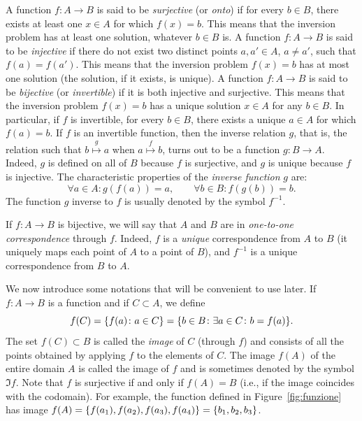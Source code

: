 A function $f\colon A \to B$ is said to be \emph{surjective}
  (or \emph{onto}) if for every $b\in B$,
there exists at least one $x\in A$ for which $f(x)=b$. This means that the
inversion problem has at least one solution, whatever $b\in B$ is. A function
$f\colon A \to B$ is said to be \emph{injective} 
 if there do not exist two distinct points $a,a' \in A$, $a\neq
a'$, such that $f(a) = f(a')$. This means that the inversion problem $f(x)=b$
has at most one solution (the solution, if it exists, is unique). A function
$f\colon A \to B$ is said to be \emph{bijective} 
 (or \emph{invertible}) 
  
 if it is both injective and surjective. This means that the
inversion problem $f(x)=b$ has a unique solution $x\in A$ for any $b\in B$. In
particular, if $f$ is invertible, for every $b\in B$, there exists a unique
$a\in A$ for which $f(a)=b$. If $f$ is an invertible function, then the inverse
relation $g$, that is, the relation such that $b\stackrel g \mapsto a$ when $a
\stackrel f \mapsto b$, turns out to be a function $g\colon B\to A$. Indeed, $g$
is defined on all of $B$ because $f$ is surjective, and $g$ is unique because
$f$ is injective. The characteristic properties of the \emph{inverse function}
  $g$ are:
\begin{equation}\label{eq:572098}
  \forall a\in A\colon g(f(a)) = a, \qquad
  \forall b\in B\colon f(g(b)) = b.
\end{equation}
The function $g$ inverse to $f$ is usually denoted by the symbol $f^{-1}$.

If $f\colon A\to B$ is bijective, we will say that $A$ and $B$ are in
\emph{one-to-one correspondence} 
 through $f$. Indeed, $f$ is a \emph{unique}
correspondence from $A$ to $B$ (it uniquely maps each point of $A$ to a point of
$B$), and $f^{-1}$ is a unique correspondence from $B$ to $A$.

We now introduce some notations that will be convenient to use later. If
$f\colon A \to B$ is a function and if $C\subset A$, we define
\[
  f(C) 
  = {\left\{ f(a)\colon a \in C \right\}} 
  = {\left\{ b\in B\colon \exists a\in C\colon b=f(a) \right\}}.
\]
The set $f(C)\subset B$ is called the \emph{image} 
  of $C$ (through $f$) and consists of all the
points obtained by applying $f$ to the elements of $C$. The image $f(A)$ of the
entire domain $A$ is called the image of $f$ and is sometimes denoted by the
symbol $\Im f$. Note that $f$ is surjective if and only if $f(A)=B$ (i.e., if
the image coincides with the codomain). For example, the function defined in
Figure~\ref{fig:funzione} has image $f(A) =
{\left\{ f(a_1),f(a_2),f(a_3),f(a_4) \right\}} = {\left\{ b_1, b_2, b_3 \right\}}$.

